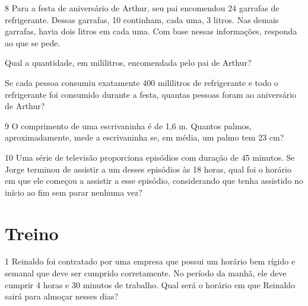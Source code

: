 {\num{8} Para a festa de aniversário de Arthur, seu pai encomendou 24
garrafas de refrigerante. Dessas garrafas, 10 continham, cada uma, 3
litros. Nas demais garrafas, havia dois litros em cada uma. Com base
nessas informações, responda ao que se pede.

\begin{escolha}
\item
  Qual a quantidade, em mililitros, encomendada pelo pai de Arthur?


\item
  Se cada pessoa consumiu exatamente 400 mililitros de refrigerante e
  todo o refrigerante foi consumido durante a festa, quantas pessoas
  foram ao aniversário de Arthur?

\end{escolha}


\num{9} O comprimento de uma escrivaninha é de 1,6 m. Quantos palmos,
aproximadamente, mede a escrivaninha se, em média, um palmo tem 23 cm?


\num{10} Uma série de televisão proporciona episódios com duração de 45
minutos. Se Jorge terminou de assistir a um desses episódios às 18 horas, qual
foi o horário em que ele começou a assistir a esse episódio, considerando que tenha assistido
no início ao fim sem parar nenhuma vez?



\section{Treino}

\num{1} Reinaldo foi contratado por uma empresa que possui um horário bem
rígido e semanal que deve ser cumprido corretamente. No período da manhã,
ele deve cumprir 4 horas e 30 minutos de trabalho. Qual será o horário em que
Reinaldo sairá para almoçar nesses dias?

}
